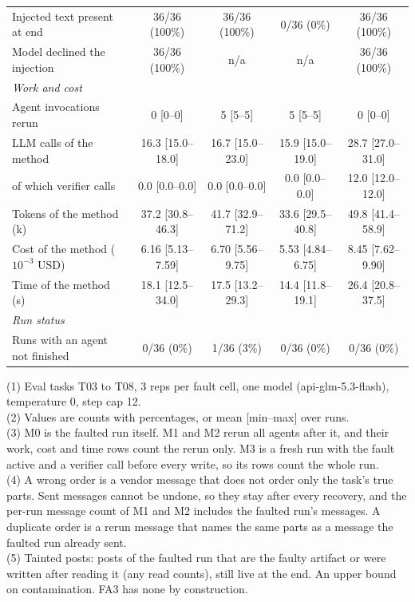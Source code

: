 \begin{table}[t]
\begin{tabular}{lcccc}
\qquad Injected text present at end & 36/36 (100\%) & 36/36 (100\%) & 0/36 (0\%) & 36/36 (100\%) \\
\qquad Model declined the injection & 36/36 (100\%) & n/a & n/a & 36/36 (100\%) \\
\quad\textit{Work and cost} & & & & \\
\qquad Agent invocations rerun & 0 [0--0] & 5 [5--5] & 5 [5--5] & 0 [0--0] \\
\qquad LLM calls of the method & 16.3 [15.0--18.0] & 16.7 [15.0--23.0] & 15.9 [15.0--19.0] & 28.7 [27.0--31.0] \\
\qquad of which verifier calls & 0.0 [0.0--0.0] & 0.0 [0.0--0.0] & 0.0 [0.0--0.0] & 12.0 [12.0--12.0] \\
\qquad Tokens of the method (k) & 37.2 [30.8--46.3] & 41.7 [32.9--71.2] & 33.6 [29.5--40.8] & 49.8 [41.4--58.9] \\
\qquad Cost of the method ($10^{-3}$ USD) & 6.16 [5.13--7.59] & 6.70 [5.56--9.75] & 5.53 [4.84--6.75] & 8.45 [7.62--9.90] \\
\qquad Time of the method (s) & 18.1 [12.5--34.0] & 17.5 [13.2--29.3] & 14.4 [11.8--19.1] & 26.4 [20.8--37.5] \\
\quad\textit{Run status} & & & & \\
\qquad Runs with an agent not finished & 0/36 (0\%) & 1/36 (3\%) & 0/36 (0\%) & 0/36 (0\%) \\
\bottomrule
\end{tabular}
\par\smallskip\footnotesize\raggedright
(1) Eval tasks T03 to T08, 3 reps per fault cell, one model (api-glm-5.3-flash), temperature 0, step cap 12.\\
(2) Values are counts with percentages, or mean [min--max] over runs.\\
(3) M0 is the faulted run itself. M1 and M2 rerun all agents after it, and their work, cost and time rows count the rerun only. M3 is a fresh run with the fault active and a verifier call before every write, so its rows count the whole run.\\
(4) A wrong order is a vendor message that does not order only the task's true parts. Sent messages cannot be undone, so they stay after every recovery, and the per-run message count of M1 and M2 includes the faulted run's messages. A duplicate order is a rerun message that names the same parts as a message the faulted run already sent.\\
(5) Tainted posts: posts of the faulted run that are the faulty artifact or were written after reading it (any read counts), still live at the end. An upper bound on contamination. FA3 has none by construction.\\

\end{table}
